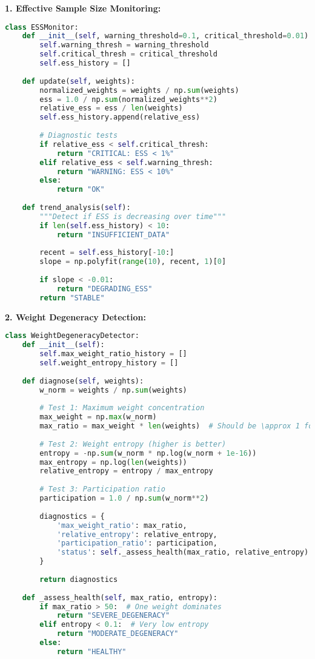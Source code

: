 \documentclass[11pt]{article}
\begin{document}
\textbf{1. Effective Sample Size Monitoring:}

\begin{lstlisting}[language=Python, basicstyle=\small]
class ESSMonitor:
    def __init__(self, warning_threshold=0.1, critical_threshold=0.01):
        self.warning_thresh = warning_threshold
        self.critical_thresh = critical_threshold
        self.ess_history = []
        
    def update(self, weights):
        normalized_weights = weights / np.sum(weights)
        ess = 1.0 / np.sum(normalized_weights**2)
        relative_ess = ess / len(weights)
        self.ess_history.append(relative_ess)
        
        # Diagnostic tests
        if relative_ess < self.critical_thresh:
            return "CRITICAL: ESS < 1%"
        elif relative_ess < self.warning_thresh:
            return "WARNING: ESS < 10%"
        else:
            return "OK"
    
    def trend_analysis(self):
        """Detect if ESS is decreasing over time"""
        if len(self.ess_history) < 10:
            return "INSUFFICIENT_DATA"
            
        recent = self.ess_history[-10:]
        slope = np.polyfit(range(10), recent, 1)[0]
        
        if slope < -0.01:
            return "DEGRADING_ESS"
        return "STABLE"
\end{lstlisting}

\textbf{2. Weight Degeneracy Detection:}

\begin{lstlisting}[language=Python, basicstyle=\small]
class WeightDegeneracyDetector:
    def __init__(self):
        self.max_weight_ratio_history = []
        self.weight_entropy_history = []
        
    def diagnose(self, weights):
        w_norm = weights / np.sum(weights)
        
        # Test 1: Maximum weight concentration
        max_weight = np.max(w_norm)
        max_ratio = max_weight * len(weights)  # Should be \approx 1 for uniform
        
        # Test 2: Weight entropy (higher is better)
        entropy = -np.sum(w_norm * np.log(w_norm + 1e-16))
        max_entropy = np.log(len(weights))
        relative_entropy = entropy / max_entropy
        
        # Test 3: Participation ratio
        participation = 1.0 / np.sum(w_norm**2)
        
        diagnostics = {
            'max_weight_ratio': max_ratio,
            'relative_entropy': relative_entropy,
            'participation_ratio': participation,
            'status': self._assess_health(max_ratio, relative_entropy)
        }
        
        return diagnostics
    
    def _assess_health(self, max_ratio, entropy):
        if max_ratio > 50:  # One weight dominates
            return "SEVERE_DEGENERACY"
        elif entropy < 0.1:  # Very low entropy
            return "MODERATE_DEGENERACY"
        else:
            return "HEALTHY"
\end{lstlisting}
\end{document}
